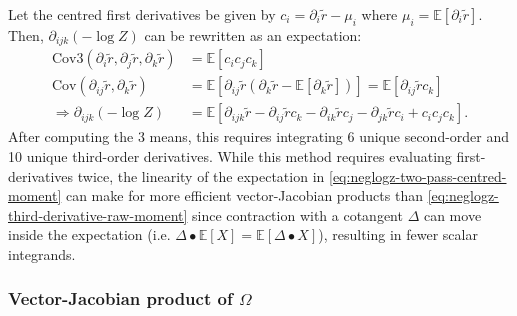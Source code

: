 \documentclass{article}
\begin{document}
Let the centred first derivatives be given by $c_{i} = \partial_{i} \tilde{r} - \mu_{i}$ where $\mu_{i} = \mathbb{E}[\partial_{i} \tilde{r}]$.
Then, $\partial_{ijk}(-\log Z)$ can be rewritten as an expectation:
%
\begin{align}
  \mathrm{Cov3}(\partial_{i} \tilde{r}, \partial_{j} \tilde{r}, \partial_{k} \tilde{r}) & = \mathbb{E}[c_{i} c_{j} c_{k}]                                                                                                                                                                           \\
  \mathrm{Cov}(\partial_{ij} \tilde{r}, \partial_{k} \tilde{r})                         & = \mathbb{E}[\partial_{ij} \tilde{r} (\partial_{k} \tilde{r} - \mathbb{E}[\partial_{k} \tilde{r}])] = \mathbb{E}[\partial_{ij} \tilde{r} c_{k}]                                                           \\
  \Rightarrow \partial_{ijk} (-\log Z)                                                  & = \mathbb{E} [ \partial_{ijk} \tilde{r} - \partial_{ij} \tilde{r} c_{k} - \partial_{ik} \tilde{r} c_{j} - \partial_{jk} \tilde{r} c_{i} + c_{i} c_{j} c_{k} ]. \label{eq:neglogz-two-pass-centred-moment}
\end{align}
%
After computing the 3 means, this requires integrating 6 unique second-order and 10 unique third-order derivatives.
While this method requires evaluating first-derivatives twice, the linearity of the expectation in \cref{eq:neglogz-two-pass-centred-moment} can make for more efficient vector-Jacobian products than \cref{eq:neglogz-third-derivative-raw-moment} since contraction with a cotangent $\Delta$ can move inside the expectation (i.e. $\Delta \bullet \mathbb{E}[X] = \mathbb{E}[\Delta \bullet X]$), resulting in fewer scalar integrands.

\subsubsection{Vector-Jacobian product of $\Omega$}
\end{document}
